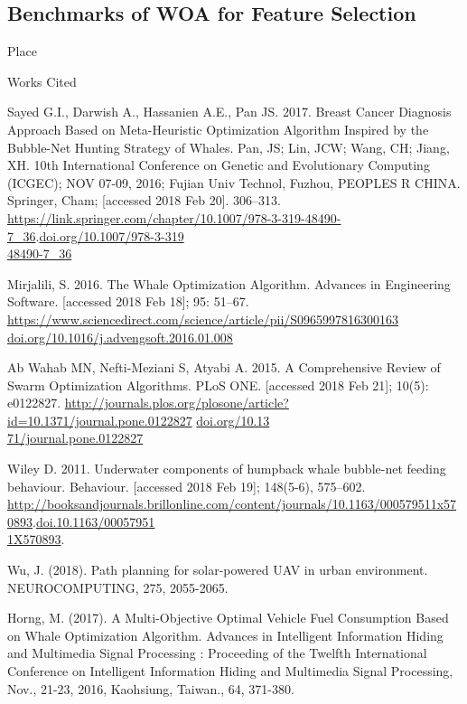 \documentclass[11pt]{article}
\newcommand{\bibent}{\noindent \hangindent 40pt}
\newenvironment{workscited}{\newpage \begin{center} Works Cited \end{center}}{\newpage }
\begin{document}
\subsection*{Benchmarks of WOA for Feature Selection} {
    Place
}
\begin{workscited}

    \bibent
    Sayed G.I., Darwish A., Hassanien A.E., Pan JS. 2017. Breast Cancer Diagnosis Approach Based on Meta-Heuristic Optimization Algorithm Inspired by the Bubble-Net Hunting Strategy of Whales. Pan, JS; Lin, JCW; Wang, CH; Jiang, XH. 10th International Conference on Genetic and Evolutionary Computing (ICGEC); NOV 07-09, 2016; Fujian Univ Technol, Fuzhou, PEOPLES R CHINA. Springer, Cham; [accessed 2018 Feb 20]. 306--313. \url{https://link.springer.com/chapter/10.1007/978-3-319-48490-7_36}.\url{doi.org/10.1007/978-3-319}\\\url{48490-7_36}

    \bibent
    Mirjalili, S. 2016. The Whale Optimization Algorithm. Advances in Engineering Software. [accessed 2018 Feb 18]; 95: 51--67. \url{https://www.sciencedirect.com/science/article/pii/S0965997816300163} \url{doi.org/10.1016/j.advengsoft.2016.01.008}

    \bibent
    Ab Wahab MN, Nefti-Meziani S, Atyabi A. 2015. A Comprehensive Review of Swarm Optimization Algorithms. PLoS ONE. [accessed 2018 Feb 21]; 10(5): e0122827. \url{http://journals.plos.org/plosone/article?id=10.1371/journal.pone.0122827} \url{doi.org/10.13}\\\url{71/journal.pone.0122827}

    \bibent
    Wiley D. 2011. Underwater components of humpback whale bubble-net feeding behaviour. Behaviour. [accessed 2018 Feb 19]; 148(5-6), 575--602. \url{http://booksandjournals.brillonline.com/content/journals/10.1163/000579511x570893}.\url{doi.10.1163/00057951}\\\url{1X570893}.


    \bibent
    Wu, J. (2018). Path planning for solar-powered UAV in urban environment. NEUROCOMPUTING, 275, 2055-2065.

    \bibent
    Horng, M. (2017). A Multi-Objective Optimal Vehicle Fuel Consumption Based on Whale Optimization Algorithm. Advances in Intelligent Information Hiding and Multimedia Signal Processing : Proceeding of the Twelfth International Conference on Intelligent Information Hiding and Multimedia Signal Processing, Nov., 21-23, 2016, Kaohsiung, Taiwan., 64, 371-380.

\end{workscited}
\end{document}
